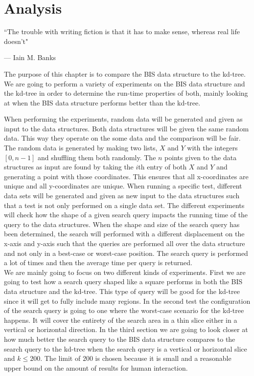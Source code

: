 \chapter{Analysis}
\label{ch:analysis}
\epigraph{``The trouble with writing fiction is that it has to make sense, whereas real life doesn't"}{--- \textup{Iain M. Banks}}

The purpose of this chapter is to compare the BIS data structure to the kd-tree. We are going to perform a variety of experiments on the BIS data structure and the kd-tree in order to determine the run-time properties of both, mainly looking at when the BIS data structure performs better than the kd-tree.


When performing the experiments, random data will be generated and given as input to the data structures. Both data structures will be given the same random data. This way they operate on the some data and the comparison will be fair. The random data is generated by making two lists, $X$ and $Y$ with the integers $[0,n-1]$ and shuffling them both randomly. The $n$ points given to the data structures as input are found by taking the $i$th entry of both $X$ and $Y$ and generating a point with those coordinates. This ensures that all x-coordinates are unique and all y-coordinates are unique. When running a specific test, different data sets will be generated and given as new input to the data structures such that a test is not only performed on a single data set. The different experiments will check how the shape of a given search query impacts the running time of the query to the data structures. When the shape and size of the search query has been determined, the search will performed with a different displacement on the x-axis and y-axis such that the queries are performed all over the data structure and not only in a best-case or worst-case position. The search query is performed a lot of times and then the average time per query is returned. \\

We are mainly going to focus on two different kinds of experiments. First we are going to test how a search query shaped like a square performs in both the BIS data structure and the kd-tree. This type of query will be good for the kd-tree since it will get to fully include many regions. In the second test the configuration of the search query is going to one where the worst-case scenario for the kd-tree happens. It will cover the entirety of the search area in a thin slice either in a vertical or horizontal direction. In the third section we are going to look closer at how much better the search query to the BIS data structure compares to the search query to the kd-tree when the search query is a vertical or horizontal slice and $k \leq 200$. The limit of $200$ is chosen because it is small and a reasonable upper bound on the amount of results for human interaction.\\

